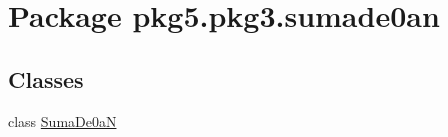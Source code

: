 \hypertarget{namespacepkg5_1_1pkg3_1_1sumade0an}{}\section{Package pkg5.\+pkg3.\+sumade0an}
\label{namespacepkg5_1_1pkg3_1_1sumade0an}
\subsection*{Classes}
\begin{DoxyCompactItemize}
\item 
class \mbox{\hyperlink{classpkg5_1_1pkg3_1_1sumade0an_1_1_suma_de0a_n}{Suma\+De0aN}}
\end{DoxyCompactItemize}
